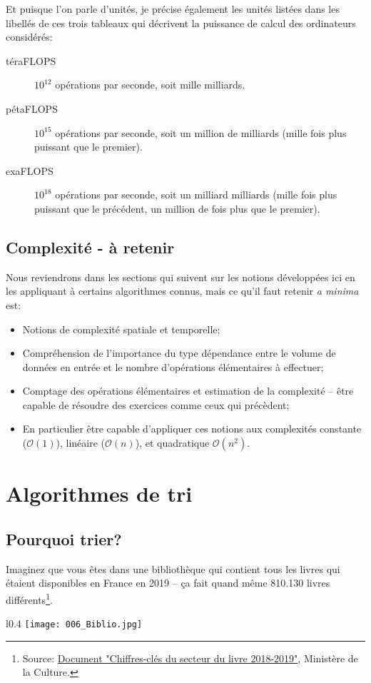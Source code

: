 \documentclass[12pt]{article}
\begin{document}
	Et puisque l'on parle d'unités, je précise également les unités listées dans les libellés de ces trois tableaux qui décrivent la puissance de calcul des ordinateurs considérés:
	\begin{description}
		\item[téraFLOPS] $10^{12}$ opérations par seconde, soit mille milliards.
		\item[pétaFLOPS] $10^{15}$ opérations par seconde, soit un million de milliards (mille fois plus puissant que le premier).
		\item[exaFLOPS] $10^{18}$ opérations par seconde, soit un milliard milliards (mille fois plus puissant que le précédent, un million de fois plus que le premier).
	\end{description}
	
	\subsection{Complexité - à retenir}
	\begin{MonRet}
		Nous reviendrons dans les sections qui suivent sur les notions développées ici en les appliquant à certains algorithmes connus, mais ce qu'il faut retenir \textit{a minima} est:
		\begin{itemize}
			\item Notions de complexité spatiale et temporelle;
			\item Compréhension de l'importance du type dépendance entre le volume de données en entrée et le nombre d'opérations élémentaires à effectuer;
			\item Comptage des opérations élémentaires et estimation de la complexité -- être capable de résoudre des exercices comme ceux qui précèdent;
			\item En particulier être capable d'appliquer ces notions aux complexités constante ($\mathcal{O}(1)$), linéaire ($\mathcal{O}(n)$), et quadratique $\mathcal{O}(n^2)$.
		\end{itemize}
	\end{MonRet}

	\pagebreak
	\section{Algorithmes de tri}
	\subsection{Pourquoi trier?}
	Imaginez que vous êtes dans une bibliothèque qui contient tous les livres qui étaient disponibles en France en 2019 -- ça fait quand même 810.130 livres différents\footnote{Source: \href{https://www.culture.gouv.fr/content/download/268286/3121285?v=1}{Document "Chiffres-clés du secteur du livre 2018-2019"}, Ministère de la Culture.}.
	\begin{wrapfigure}{l}{0.4\textwidth}
		\texttt{[image: 006\_Biblio.jpg]}
	\end{wrapfigure}
	
\end{document}
